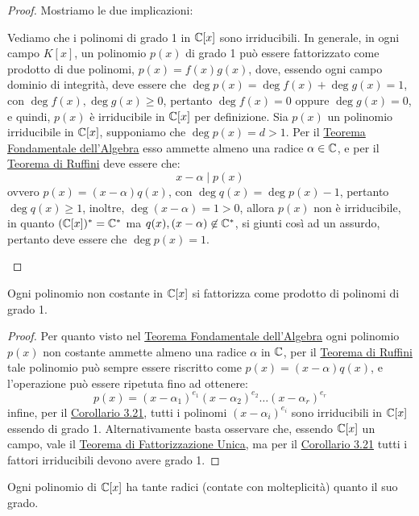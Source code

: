 \documentclass[11pt]{scrartcl}
\begin{document}
\begin{proof}
Mostriamo le due implicazioni:
	\begin{itemize}
	\ii Vediamo che i polinomi di grado 1 in $\mathbb C[x]$ sono irriducibili. In generale, in ogni campo $K[x]$, un polinomio $p(x)$ di grado 1 può essere fattorizzato 
	come prodotto di due polinomi, $p(x) = f(x)g(x)$, dove, essendo ogni campo dominio di integrità, deve essere che $\deg p(x) = \deg f(x) + \deg g(x) = 1$, 
	con $\deg f(x), \deg g(x) \geq 0$, pertanto $\deg f(x) = 0$ oppure $\deg g(x) = 0$, e quindi, $p(x)$ è irriducibile in $\mathbb C[x]$ per definizione.
	\ii Sia $p(x)$ un polinomio irriducibile in $\mathbb C[x]$, supponiamo che $\deg p(x) = d > 1$. Per il \hyperref[p:tf]{Teorema Fondamentale dell'Algebra} esso 
	ammette almeno una radice $\alpha \in \mathbb C$, e per il \hyperref[p:ruffini]{Teorema di Ruffini} deve essere che:
		\[ x - \alpha \mid p(x)
		\]
		ovvero $p(x) = (x - \alpha) q(x)$, con $\deg q(x) = \deg p(x) - 1$, pertanto $\deg q(x) \geq 1$, inoltre, $\deg(x-\alpha) = 1>0$, allora $p(x)$ non è irriducibile, in quanto $(\mathbb C[x])^* = \mathbb C^*$ ma $q(x),(x - \alpha) \not\in \mathbb C^*$, si  giunti così ad un assurdo, pertanto deve essere che $\deg p(x) = 1$.
	\end{itemize}
\end{proof}

\begin{corollary}
\label{p:3.22}
Ogni polinomio non costante in $\mathbb C[x]$ si fattorizza come prodotto di polinomi di grado 1.
\end{corollary}

\begin{proof}
Per quanto visto nel \hyperref[p:tf]{Teorema Fondamentale dell'Algebra} ogni polinomio $p(x)$ non costante ammette almeno una radice $\alpha$ in $\mathbb C$, per il \hyperref[p:ruffini]{Teorema di Ruffini} tale polinomio può sempre essere riscritto come $p(x) = (x-\alpha)q(x)$, e l'operazione può essere ripetuta fino ad ottenere:
	\[ p(x) = (x - \alpha_1)^{e_1}(x - \alpha_2)^{e_2}\ldots (x - \alpha_r)^{e_r}
	\]
infine, per il \hyperref[p:3.21]{Corollario 3.21}, tutti i polinomi $(x - \alpha_i)^{e_i}$ sono irriducibili in $\mathbb C[x]$ essendo di grado 1.
Alternativamente basta osservare che, essendo $\mathbb C[x]$ un campo, vale il \hyperref[p:fac]{Teorema di Fattorizzazione Unica}, ma per il \hyperref[p:3.21]{Corollario 3.21} tutti i fattori irriducibili devono avere grado 1.
\end{proof}

\begin{corollary}
Ogni polinomio di $\mathbb C[x]$ ha tante radici (contate con molteplicità) quanto il suo grado.
\end{corollary}
\end{document}
